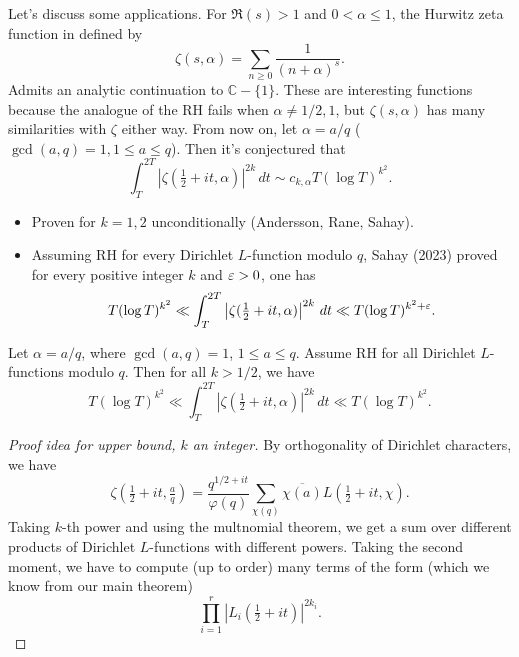 \documentclass[reqno]{amsart} 
\begin{document}
Let's discuss some applications.  For $\Re(s) > 1$ and $0 < \alpha \leq 1$, the Hurwitz zeta function in defined by
\begin{equation*}
  \zeta(s, \alpha) = \sum_{n \geq 0} \frac{1}{(n + \alpha)^s}.
\end{equation*}
Admits an analytic continuation to $\mathbb{C} - \{1\}$.  These are interesting functions because the analogue of the RH fails when $\alpha \neq 1/2, 1$, but $\zeta(s, \alpha)$ has many similarities with $\zeta$ either way.  From now on, let $\alpha = a/q$ ($\gcd(a, q) = 1, 1 \leq a \leq q$).  Then it's conjectured that
\begin{equation*}
  \int_T^{2 T} \left| \zeta(\tfrac{1}{2} + i t, \alpha) \right|^{2 k}
  \, d t
  \sim c_{k, \alpha} T(\log T)^{k^2}.
\end{equation*}
\begin{itemize}
\item Proven for $k = 1, 2$ unconditionally (Andersson, Rane, Sahay).
\item Assuming RH for every Dirichlet $L$-function modulo $q$, Sahay (2023) proved for every positive integer $k$ and $\varepsilon > 0$, one has
  \begin{equation*}
    T(\log T)^{k^2} \ll \int_T^{2 T}
    \left| \zeta(\tfrac{1}{2} + i t, \alpha) \right|^{2 k} \, d t
    \ll
    T(\log T)^{k^2 + \varepsilon}.
  \end{equation*}
\end{itemize}
\begin{theorem}[H.\ 2024+]
  Let $\alpha = a/q$, where $\gcd(a, q) = 1$, $1 \leq a \leq q$.  Assume RH for all Dirichlet $L$-functions modulo $q$.  Then for all $k > 1/2$, we have
  \begin{equation*}
    T(\log T)^{k^2} \ll \int_T^{2 T}
    \left| \zeta(\tfrac{1}{2} + i t, \alpha) \right|^{2 k} \, d t
    \ll
    T(\log T)^{k^2}.
  \end{equation*}
\end{theorem}
\begin{proof}[Proof idea for upper bound, $k$ an integer]
  By orthogonality of Dirichlet characters, we have
  \begin{equation*}
    \zeta(\tfrac{1}{2} + i t, \tfrac{a}{q})
    =
    \frac{q    ^{1/2 + i t}}{\varphi(q)}
    \sum_{\chi(q)} \overline{\chi(a)}
    L(\tfrac{1}{2} + i t, \chi).
  \end{equation*}
  Taking $k$-th power and using the multnomial theorem, we get a sum over different products of Dirichlet $L$-functions with different powers.  Taking the second moment, we have to compute (up to order) many terms of the form (which we know from our main theorem)
  \begin{equation*}
    \prod_{i = 1}^r
    \left| L_i(\tfrac{1}{2} + it) \right|^{2 k_i}.
  \end{equation*}
\end{proof}
\end{document}
